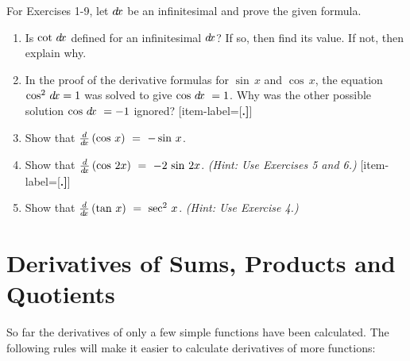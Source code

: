 \divider
\vspace{3mm}
\startexercises\label{sec1dot3}
{\small
{}
\par\noindent For Exercises 1-9, let $d\!x$ be an infinitesimal and prove the given formula.
\begin{enumerate}[item-label={\bfseries \arabic*.}]
 \item Is $\cot\,d\!x$ defined for an infinitesimal $d\!x$? If so, then find its value.
  If not, then explain why.
 \item In the proof of the derivative formulas for $\sin\, x$ and $\cos\, x$,
 the equation $\cos^2\,d\!x = 1$ was solved to give $\cos\,d\!x\ = 1$.
 Why was the other possible solution $\cos\,d\!x\ = -1$ ignored?
[item-label={{[\bfseries \arabic*.]}}]
 \item Show that $\frac{d}{d\!x} \,(\cos\,x) ~=~ -\sin\,x$.
 \item Show that $\frac{d}{d\!x} \,(\cos\,2x) ~=~ -2\,\sin\,2x$. \emph{(Hint: Use Exercises
 5 and 6.)}
[item-label={{[\bfseries \arabic*.]}}]
 \item Show that $\frac{d}{d\!x} \,(\tan\,x) ~=~ \sec^2 \,x$. \emph{(Hint: Use Exercise 4.)}
\end{enumerate}}
\newpage
\section{Derivatives of Sums, Products and Quotients}
So far the derivatives of only a few simple functions have been calculated. The
following rules will make it easier to calculate derivatives of more functions:


